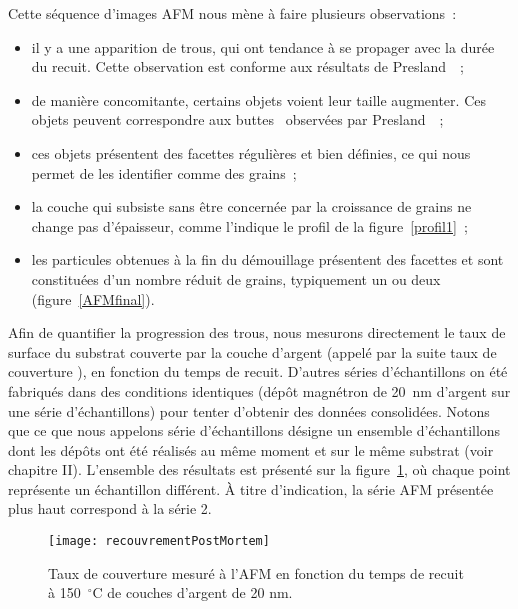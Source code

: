Cette séquence d'images AFM nous mène à faire plusieurs observations~:
\begin{itemize}
	\item il y a une apparition de trous, qui ont tendance à se propager avec la durée du recuit. Cette observation est conforme aux résultats de Presland~\cite{presland1972hillock}~;
	\item de manière concomitante, certains objets voient leur taille augmenter. Ces objets peuvent correspondre aux \og buttes \fg{}~observées par Presland~\cite{presland1972hillock, presland1972role}~;
	\item ces objets présentent des facettes régulières et bien définies, ce qui nous permet de les identifier comme des grains~;
	\item la couche qui subsiste sans être concernée par la croissance de grains ne change pas d'épaisseur, comme l'indique le profil de la figure~\ref{profil1}~;
	\item les particules obtenues à la fin du démouillage présentent des facettes et sont constituées d'un nombre réduit de grains, typiquement un ou deux (figure~\ref{AFMfinal}).
\end{itemize} 

Afin de quantifier la progression des trous, nous mesurons directement le taux de surface du substrat couverte par la couche d'argent (appelé par la suite \og taux de couverture \fg{}), en fonction du temps de recuit. D'autres séries d'échantillons on été fabriqués dans des conditions identiques (dépôt magnétron de 20~nm d'argent sur une série d'échantillons) pour tenter d'obtenir des données consolidées. Notons que ce que nous appelons \og série d'échantillons \fg{} désigne un ensemble d'échantillons dont les dépôts ont été réalisés au même moment et sur le même substrat (voir chapitre II). L'ensemble des résultats est présenté sur la figure~\ref{PostMortemAFM}, où chaque point représente un échantillon différent. À titre d'indication, la série AFM présentée plus haut correspond à la \og série 2\fg{}.\par

\begin{figure}[h!]
	\centering
	\texttt{[image: recouvrementPostMortem]}
	\caption{Taux de couverture mesuré à l'AFM en fonction du temps de recuit à 150~$^\circ$C de couches d'argent de 20 nm.}
	\label{PostMortemAFM}
\end{figure}

